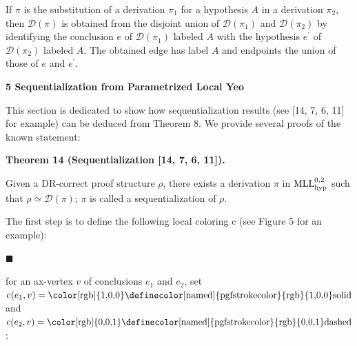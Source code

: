  
If $\pi$ is the substitution of a derivation $\pi_{1}$ for a hypothesis $A$ in a derivation $\pi_{2}$, then $\mathcal{D}(\pi)$ is obtained from the disjoint union of $\mathcal{D}(\pi_{1})$ and $\mathcal{D}(\pi_{2})$ by identifying the conclusion $e$ of $\mathcal{D}(\pi_{1})$ labeled $A$ with the hypothesis $e^{\prime}$ of $\mathcal{D}(\pi_{2})$ labeled $A$. The obtained edge has label $A$ and endpoints the union of those of $e$ and $e^{\prime}$.\par
 
 
 
 


 
\par\medskip\noindent\textbf{5 Sequentialization from Parametrized Local Yeo}\par
 
 
This section is dedicated to show how sequentialization results (see [14, 7, 6, 11] for example) can be deduced from Theorem 8. We provide several proofs of the known statement:\par
 
 
 
\par\medskip\noindent\textbf{Theorem 14 (Sequentialization [14, 7, 6, 11]).}\par
 
 
Given a DR-correct proof structure $\rho$, there exists a derivation $\pi$ in $\textnormal{{MLL}}^{0,2}_{\textnormal{{hyp}}}$ such that $\rho\simeq\mathcal{D}(\pi)$; $\pi$ is called a sequentialization of $\rho$.\par
 
 
 
 
The first step is to define the following local coloring c (see Figure 5 for an example):\par
  
\par\noindent  $\blacksquare$ 
 
for an ax-vertex $v$ of conclusions $e_{1}$ and $e_{2}$, set $\textnormal{{c}}(e_{1},v)=\text{{\color[rgb]{1,0,0}\definecolor[named]{%
pgfstrokecolor}{rgb}{1,0,0}solid}}$ and $\textnormal{{c}}(e_{2},v)=\text{{\color[rgb]{0,0,1}\definecolor[named]{%
pgfstrokecolor}{rgb}{0,0,1}dashed}}$;\par
 
